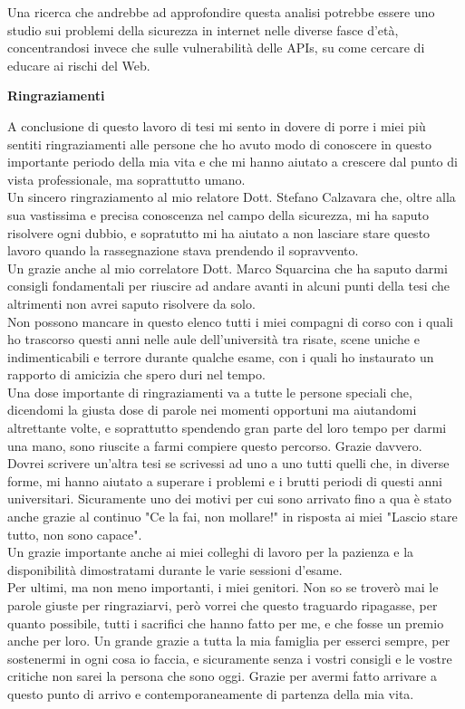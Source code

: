 \documentclass[12pt ,a4paper , twoside , openright ]{book}
\begin{document}
	Una ricerca che andrebbe ad approfondire questa analisi potrebbe essere uno studio sui problemi della sicurezza in internet nelle diverse fasce d'età, concentrandosi invece che sulle vulnerabilità delle APIs, su come cercare di educare ai rischi del Web.
	\cleardoublepage
	\thispagestyle{empty}
	\begin{center}
		\textbf{Ringraziamenti}
	\end{center}
	A conclusione di questo lavoro di tesi mi sento in dovere di porre i miei più sentiti ringraziamenti alle persone che ho avuto modo di conoscere in questo importante periodo della mia vita e che mi hanno aiutato a crescere dal punto di vista professionale,  ma soprattutto umano.
		\\
	Un sincero ringraziamento al mio relatore Dott. Stefano Calzavara che, oltre alla sua vastissima e precisa conoscenza nel campo della sicurezza, mi ha saputo risolvere ogni dubbio, e sopratutto mi ha aiutato a non lasciare stare questo lavoro quando la rassegnazione stava prendendo il sopravvento.
	\\
	Un grazie anche al mio correlatore Dott. Marco Squarcina che ha saputo darmi consigli fondamentali per riuscire ad andare avanti in alcuni punti della tesi che altrimenti non avrei saputo risolvere da solo.
	\\
	Non possono mancare in questo elenco tutti i miei compagni di corso con i quali ho trascorso questi anni nelle aule dell'università tra risate, scene uniche e indimenticabili e terrore durante qualche esame, con i quali ho instaurato un rapporto di amicizia che spero duri nel tempo.
	\\
	Una dose importante di ringraziamenti va a tutte le persone speciali che, dicendomi la giusta dose di parole nei momenti opportuni ma aiutandomi altrettante volte, e soprattutto spendendo gran parte del loro tempo per darmi una mano, sono riuscite a farmi compiere questo percorso. Grazie davvero.
	\\
	Dovrei scrivere un'altra tesi se scrivessi ad uno a uno tutti quelli che, in diverse forme, mi hanno aiutato a superare i problemi e i brutti periodi di questi anni universitari. Sicuramente uno dei motivi per cui sono arrivato fino a qua è stato anche grazie al continuo "Ce la fai, non mollare!" in risposta ai miei "Lascio stare tutto, non sono capace". 
	\\
	Un grazie importante anche ai miei colleghi di lavoro per la pazienza e la disponibilità dimostratami durante le varie sessioni d'esame. 
	\\
	Per ultimi, ma non meno importanti, i miei genitori.
	Non so se troverò mai le parole giuste per ringraziarvi, però vorrei che questo traguardo ripagasse, per quanto possibile, tutti i sacrifici che hanno fatto per me, e che fosse un premio anche per loro.
	Un grande grazie a tutta la mia famiglia per esserci sempre, per sostenermi in ogni cosa io faccia, e sicuramente senza i vostri consigli e le vostre critiche non sarei la persona che sono oggi.
	Grazie per avermi fatto arrivare a questo punto di arrivo e contemporaneamente di partenza della mia vita.
\listoffigures
\lstlistoflistings

\end{document}
